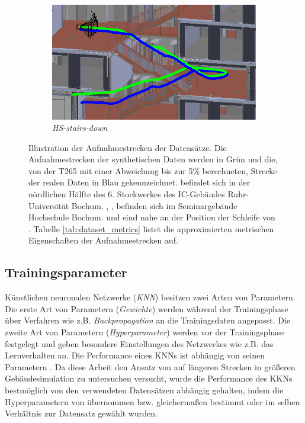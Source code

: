 \begin{figure}
\begin{subfigure}[tl]{0.45\linewidth}
		\flushright		\includegraphics[width=\linewidth]{images/trajectories/hs_down.png}
		\caption{\textit{HS-stairs-down}}
		\label{subfig:traj_hs-down}
	\end{subfigure}
	\hfill
	\caption{Illustration der Aufnahmestrecken der Datensätze. Die Aufnahmestrecken der synthetischen Daten werden in Grün und die, von der T265 mit einer Abweichung bis zur 5\% berechneten, Strecke der realen Daten in Blau gekennzeichnet.  befindet sich in der nördlichen Hälfte des 6. Stockwerkes des IC-Gebäudes Ruhr-Universität Bochum. , ,  befinden sich im Seminargebäude Hochschule Bochum.  und  sind nahe an der Position der Schleife von . Tabelle \ref{tab:dataset_metrics} listet die approximierten metrischen Eigenschaften der Aufnahmestrecken auf.}
	\label{fig:trajectories}
\end{figure}

\subsection{Trainingsparameter}
Künstlichen neuronalen Netzwerke (\textit{KNN}) besitzen zwei Arten von Parametern. Die erste Art von Parametern (\textit{Gewichte}) werden während der Trainingsphase über Verfahren wie z.B. \textit{Backpropagation} an die Trainingsdaten angepasst.
Die zweite Art von Parametern (\textit{Hyperparameter}) werden vor der Trainingsphase festgelegt und geben besondere Einstellungen des Netzwerkes wie z.B. das Lernverhalten an. Die Performance eines KNNs ist abhängig von seinen Parametern \cite{Goodfellow-et-al-2016}. Da diese Arbeit den Ansatz von \citet{acharyaBIMPoseNetIndoorCamera2019} auf längeren Strecken in größeren Gebäudesimulation zu untersuchen versucht, wurde die Performance des KKNs bestmöglich von den verwendeten Datensätzen abhängig gehalten, indem die Hyperparametern von \citet{acharyaBIMPoseNetIndoorCamera2019} übernommen bzw. gleichermaßen bestimmt oder im selben Verhältnis zur Datensatz gewählt wurden.

